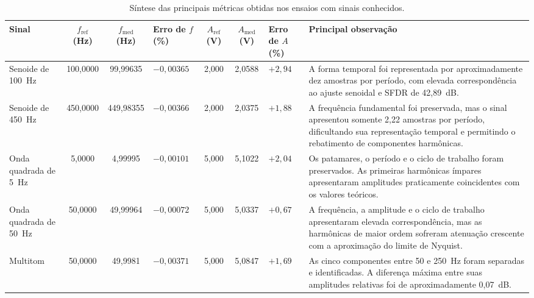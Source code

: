 \documentclass[a4paper,12pt]{fcte}
\begin{document}
\begin{landscape}
\begin{table}[p]
    \centering
    \caption{Síntese das principais métricas obtidas nos ensaios com sinais conhecidos.}
    \label{tab:sintese_sinais_conhecidos}
    \small
    \renewcommand{\arraystretch}{1.25}
    \begin{tabularx}{\linewidth}{p{2.0cm} c c p{1.5cm} c c p{1.5cm} X}
        \hline
        \textbf{Sinal} &
        \textbf{$f_{\mathrm{ref}}$ (Hz)} &
        \textbf{$f_{\mathrm{med}}$ (Hz)} &
        \textbf{Erro de $f$ (\%)} &
        \textbf{$A_{\mathrm{ref}}$ (V)} &
        \textbf{$A_{\mathrm{med}}$ (V)} &
        \textbf{Erro de $A$ (\%)} &
        \textbf{Principal observação} \\
        \hline

        Senoide de 100~Hz &
        100,0000 &
        99,99635 &
        $-0,00365$ &
        2,000 &
        2,0588 &
        $+2,94$ &
        A forma temporal foi representada por aproximadamente dez amostras por período, com elevada correspondência ao ajuste senoidal e SFDR de 42,89~dB. \\

        Senoide de 450~Hz &
        450,0000 &
        449,98355 &
        $-0,00366$ &
        2,000 &
        2,0375 &
        $+1,88$ &
        A frequência fundamental foi preservada, mas o sinal apresentou somente 2,22 amostras por período, dificultando sua representação temporal e permitindo o rebatimento de componentes harmônicas. \\

        Onda quadrada de 5~Hz &
        5,0000 &
        4,99995 &
        $-0,00101$ &
        5,000 &
        5,1022 &
        $+2,04$ &
        Os patamares, o período e o ciclo de trabalho foram preservados. As primeiras harmônicas ímpares apresentaram amplitudes praticamente coincidentes com os valores teóricos. \\

        Onda quadrada de 50~Hz &
        50,0000 &
        49,99964 &
        $-0,00072$ &
        5,000 &
        5,0337 &
        $+0,67$ &
        A frequência, a amplitude e o ciclo de trabalho apresentaram elevada correspondência, mas as harmônicas de maior ordem sofreram atenuação crescente com a aproximação do limite de Nyquist. \\

        Multitom &
        50,0000 &
        49,9981 &
        $-0,00371$ &
        5,000 &
        5,0847 &
        $+1,69$ &
        As cinco componentes entre 50 e 250~Hz foram separadas e identificadas. A diferença máxima entre suas amplitudes relativas foi de aproximadamente 0,07~dB. \\


\end{tabularx}
\end{table}
\end{landscape}
\end{document}
